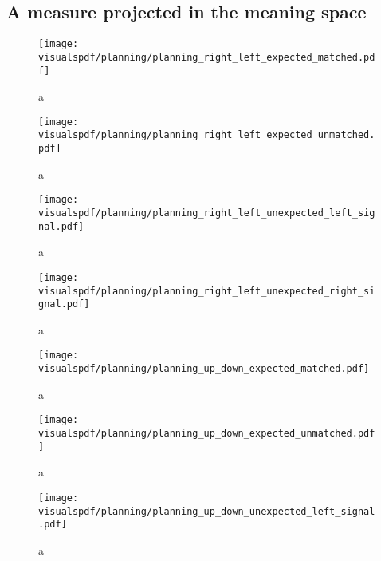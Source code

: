 \subsection{A measure projected in the meaning space}

\begin{figure}[!ht]
  \centering
  \texttt{[image: \\visualspdf/planning/planning\_right\_left\_expected\_matched.pdf]}
  \caption{a}
  \label{fig:uncertaintysmeaningrightleftexpectedleft}
\end{figure}

\begin{figure}[!ht]
  \centering
  \texttt{[image: \\visualspdf/planning/planning\_right\_left\_expected\_unmatched.pdf]}
  \caption{a}
  \label{fig:uncertaintysmeaningrightleftexpectedright}
\end{figure}

\begin{figure}[!ht]
  \centering
  \texttt{[image: \\visualspdf/planning/planning\_right\_left\_unexpected\_left\_signal.pdf]}
  \caption{a}
  \label{fig:uncertaintysmeaningrightleftunexpectedleft}
\end{figure}

\begin{figure}[!ht]
  \centering
  \texttt{[image: \\visualspdf/planning/planning\_right\_left\_unexpected\_right\_signal.pdf]}
  \caption{a}
  \label{fig:uncertaintysmeaningrightleftunexpectedright}
\end{figure}




\begin{figure}[!ht]
  \centering
  \texttt{[image: \\visualspdf/planning/planning\_up\_down\_expected\_matched.pdf]}
  \caption{a}
  \label{fig:uncertaintysmeaningupdownexpectedleft}
\end{figure}

\begin{figure}[!ht]
  \centering
  \texttt{[image: \\visualspdf/planning/planning\_up\_down\_expected\_unmatched.pdf]}
  \caption{a}
  \label{fig:uncertaintysmeaningupdownexpectedright}
\end{figure}

\begin{figure}[!ht]
  \centering
  \texttt{[image: \\visualspdf/planning/planning\_up\_down\_unexpected\_left\_signal.pdf]}
  \caption{a}
  \label{fig:uncertaintysmeaningupdownunexpectedleft}
\end{figure}

